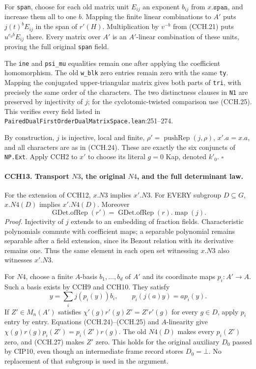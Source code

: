 For \texttt{span}, choose for each old matrix unit $E_{ij}$
an exponent $b_{ij}$ from $x.\texttt{span}$, and increase
them all to one $b$.  Mapping the finite linear combinations
to $A'$ puts $j(t)^bE_{ij}$ in the span of $r'(H)$.
Multiplication by $v^{-b}$ from (CCH.21) puts
$u^{e_0b}E_{ij}$ there.  Every matrix over $A'$ is an
$A'$-linear combination of these units, proving the full
original \texttt{span} field.

The \texttt{ine} and \texttt{psi\_mu} equalities remain
one after applying the coefficient homomorphism.
The old \texttt{w\_blk} zero entries remain zero with the
same \texttt{ty}.  Mapping the conjugated upper-triangular
matrix gives both parts of \texttt{tri}, with precisely the
same order of the characters.  The two distinctness clauses
in \texttt{N1} are preserved by injectivity of $j$; for the
cyclotomic-twisted comparison use (CCH.25).
This verifies every field listed in
\nolinkurl{PairedDualFirstOrderDualMatrixSpace.lean}:251--274.

By construction, $j$ is injective, local and finite,
$\rho'=\operatorname{pushRep}(j,\rho)$, $x'.a=x.a$, and
all characters are as in (CCH.24).  These are exactly the
six conjuncts of \texttt{NP.Ext}.  Apply CCH2 to $x'$ to
choose its literal $g=0$ Kap, denoted $k'_0$.
\hfill$\square$

\paragraph{CCH13. Transport $N3$, the original $N4$, and the full determinant law.}
\label{claim:CCH13}
For the extension of CCH12, $x.N3$ implies $x'.N3$.
For EVERY subgroup $D\subseteq G$, $x.N4(D)$ implies
$x'.N4(D)$.  Moreover
\[
 \operatorname{GDet.ofRep}(r')
       =\operatorname{GDet.ofRep}(r).\operatorname{map}(j).
 \tag{CCH.26}
\]
\emph{Proof.}
Injectivity of $j$ extends to an embedding of fraction fields.
Characteristic polynomials commute with coefficient maps;
a separable polynomial remains separable after a field
extension, since its Bezout relation with its derivative
remains one.  Thus the same element in each open set
witnessing $x.N3$ also witnesses $x'.N3$.

For $N4$, choose a finite $A$-basis $b_1,\ldots,b_d$ of
$A'$ and its coordinate maps $p_i:A'\to A$.  Such a basis
exists by CCH9 and CCH10.  They satisfy
\[
 y=\sum_i j(p_i(y))b_i,\qquad
                    p_i(j(a)y)=a p_i(y).               \tag{CCH.27}
\]
If $Z'\in M_n(A')$ satisfies
$\chi'(g)r'(g)Z'=Z'r'(g)$ for every $g\in D$,
apply $p_i$ entry by entry.  Equations (CCH.24)--(CCH.25)
and $A$-linearity give
$\chi(g)r(g)p_i(Z')=p_i(Z')r(g)$.
The old $N4(D)$ makes every $p_i(Z')$ zero, and (CCH.27)
makes $Z'$ zero.  This holds for the original auxiliary
$D_0$ passed by CIP10, even though an intermediate frame
record stores $D_0=\bot$.  No replacement of that subgroup
is used in the argument.

